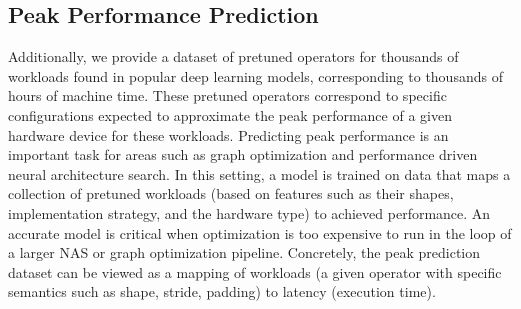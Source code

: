 \subsection{Peak Performance Prediction}
\label{sec:peakperformance}
Additionally, we provide a dataset of pretuned operators for thousands of workloads found in popular deep learning models, corresponding to thousands of hours of machine time.
These pretuned operators correspond to specific configurations expected to approximate the peak performance of a given hardware device for these workloads.
Predicting peak performance is an important task for areas such as graph optimization and performance driven neural architecture search.
In this setting, a model is trained on data that maps a collection of pretuned workloads (based on features such as their shapes, implementation strategy, and the hardware type) to achieved performance.
An accurate model is critical when optimization is too expensive to run in the loop of a larger NAS or graph optimization pipeline.
Concretely, the peak prediction dataset can be viewed as a mapping of workloads (a given operator with specific semantics such as shape, stride, padding) to latency (execution time).


